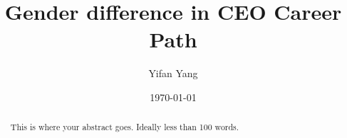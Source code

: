 \documentclass[10pt]{article}
\begin{document}
\title{Gender difference in CEO Career Path}
\author{Yifan Yang}
\date{\today}

\maketitle

\singlespace
\begin{abstract}

\noindent This is where your abstract goes.  Ideally less than 100 words.

\end{abstract}

\doublespace
\maketitle
\setcounter{page}{0}
\thispagestyle{empty}
\newpage















\newpage
\begin{appendices}


\end{appendices}
\end{document}
